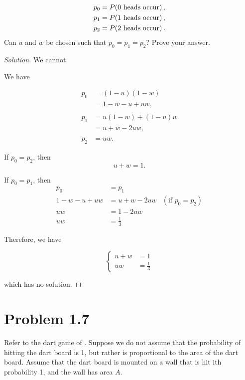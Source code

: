 \documentclass[12pt,letterpaper,reqno]{amsart}
\numberwithin{equation}{subsection}
\begin{document}
\begin{align*}
    p_0 &= {P}\! \left( {\mbox{0 heads occur}} \right), \\
    p_1 &= {P}\! \left( {\mbox{1 heads occur}} \right), \\
    p_2 &= {P}\! \left( {\mbox{2 heads occur}} \right). \\
\end{align*}
Can $u$ and $w$ be chosen such that $p_0 = p_1 = p_2$? Prove your answer.

\begin{proof}[Solution]
We cannot. 

We have

\begin{align*}
    p_0 &= (1-u)(1-w) \\
        &= 1-w-u+uw, \\
        \\
    p_1 &= u(1-w) + (1-u)w \\
        &= u+w -2uw, \\
        \\
    p_2 &= uw.
\end{align*}

If $p_0 = p_2$, then
\[ u + w = 1. \]

If $p_0 = p_1$, then
\begin{align*}
    p_0 &= p_1 \\
    1 - w - u + uw &= u + w - 2uw & \left(\mbox{if $p_0 = p_2$} \right) \\
    uw &= 1 - 2uw \\
    uw &= \frac{1}{3}
\end{align*}

Therefore, we have

\[ \left\{ \begin{array}{cc}
    u + w &= 1 \\
    uw &= \frac{1}{3}
\end{array} \right. \]

which has no solution.
\end{proof}

\newpage
\section{Problem 1.7}

Refer to the dart game of \cite[Example 1.2.7 on page 8]{Berger-Casella}. Suppose we do not assume that the probability of hitting the dart board is 1, but rather is proportional to the area of the dart board. Assume that the dart board is mounted on a wall that is hit ith probability 1, and the wall has area $A$.
\end{document}
